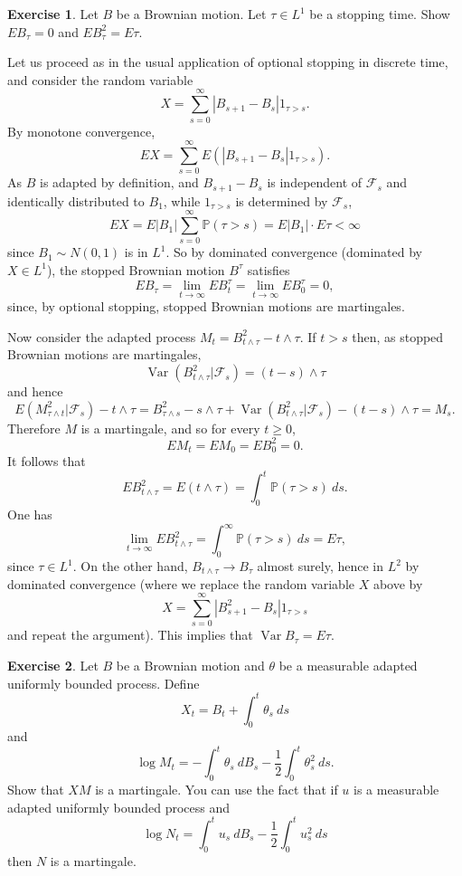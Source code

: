 \documentclass[10pt]{article}
\newcommand{\PP}{\mathbb P}
\DeclareMathOperator{\Var}{Var}
\theoremstyle{definition}
\newtheorem{exer}{Exercise}
\begin{document}
\begin{exer}
Let $B$ be a Brownian motion. Let $\tau \in L^1$ be a stopping time. Show $EB_\tau = 0$ and $EB_\tau^2 = E\tau$.
\end{exer}

Let us proceed as in the usual application of optional stopping in discrete time, and consider the random variable
$$X = \sum_{s=0}^\infty |B_{s + 1} - B_s|1_{\tau > s}.$$
By monotone convergence,
$$EX = \sum_{s=0}^\infty E(|B_{s + 1} - B_s|1_{\tau > s}).$$
As $B$ is adapted by definition, and $B_{s + 1} - B_s$ is independent of $\mathcal F_s$ and identically distributed to $B_1$, while $1_{\tau > s}$ is determined by $\mathcal F_s$,
$$EX = E|B_1| \sum_{s=0}^\infty \PP(\tau > s) = E|B_1| \cdot E\tau < \infty$$
since $B_1 \sim N(0, 1)$ is in $L^1$.
So by dominated convergence (dominated by $X \in L^1$), the stopped Brownian motion $B^\tau$ satisfies
$$EB_\tau = \lim_{t \to \infty} EB^\tau_t = \lim_{t \to \infty} EB^\tau_0 = 0,$$
since, by optional stopping, stopped Brownian motions are martingales.

Now consider the adapted process $M_t = B_{t \wedge \tau}^2 - t \wedge \tau$.
If $t > s$ then, as stopped Brownian motions are martingales,
$$\Var(B_{t \wedge \tau}^2|\mathcal F_s) = (t - s) \wedge \tau$$
and hence
$$E(M_{\tau \wedge t}^2|\mathcal F_s) - t \wedge \tau = B_{\tau \wedge s}^2 - s \wedge \tau + \Var(B_{t \wedge \tau}^2|\mathcal F_s) - (t - s) \wedge \tau = M_s.$$
Therefore $M$ is a martingale, and so for every $t \geq 0$,
$$EM_t = EM_0 = EB_0^2 = 0.$$
It follows that
$$EB_{t \wedge \tau}^2 = E(t \wedge \tau) = \int_0^t \PP(\tau > s) ~ds.$$
One has
$$\lim_{t \to \infty} EB_{t \wedge \tau}^2 = \int_0^\infty \PP(\tau > s) ~ds = E\tau,$$
since $\tau \in L^1$.
On the other hand, $B_{t \wedge \tau} \to B_\tau$ almost surely, hence in $L^2$ by dominated convergence (where we replace the random variable $X$ above by
$$X = \sum_{s = 0}^\infty |B_{s + 1}^2 - B_s|1_{\tau > s}$$
and repeat the argument).
This implies that $\Var B_\tau = E\tau$.


\begin{exer}
Let $B$ be a Brownian motion and $\theta$ be a measurable adapted uniformly bounded process. Define
$$X_t = B_t + \int_0^t \theta_s ~ds$$
and
$$\log M_t = -\int_0^t \theta_s ~dB_s - \frac{1}{2} \int_0^t \theta_s^2 ~ds.$$
Show that $XM$ is a martingale. You can use the fact that if $u$ is a measurable adapted uniformly bounded process and
$$\log N_t = \int_0^t u_s ~dB_s - \frac{1}{2} \int_0^t u_s^2 ~ds$$
then $N$ is a martingale.
\end{exer}
\end{document}
